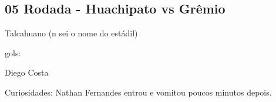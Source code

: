 \newpage
\subsection{05 Rodada - Huachipato vs Grêmio}

\begin{figure}[H]
    \centering
    
\end{figure}



Talcahuano (n sei o nome do estádil)

gols:

Diego Costa

Curiosidades: Nathan Fernandes entrou e vomitou poucos minutos depois.